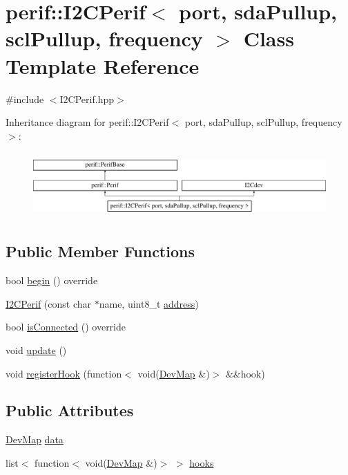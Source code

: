 \hypertarget{classperif_1_1I2CPerif}{}\section{perif\+::I2\+C\+Perif$<$ port, sda\+Pullup, scl\+Pullup, frequency $>$ Class Template Reference}
\label{classperif_1_1I2CPerif}


{\ttfamily \#include $<$I2\+C\+Perif.\+hpp$>$}

Inheritance diagram for perif\+::I2\+C\+Perif$<$ port, sda\+Pullup, scl\+Pullup, frequency $>$\+:\begin{figure}[H]
\begin{center}
\leavevmode
\includegraphics[height=2.514970cm]{classperif_1_1I2CPerif}
\end{center}
\end{figure}
\subsection*{Public Member Functions}
\begin{DoxyCompactItemize}
\item 
bool \mbox{\hyperlink{classperif_1_1I2CPerif_aa91b8eca31223fddd191a50b8a0a526d}{begin}} () override
\item 
\mbox{\hyperlink{classperif_1_1I2CPerif_a80ab5e9bf8a8f2f2278a35d646442b1b}{I2\+C\+Perif}} (const char $\ast$name, uint8\+\_\+t \mbox{\hyperlink{classperif_1_1I2CPerif_a3275bcc89b3d8ddfa221fb76669c2d45}{address}})
\item 
bool \mbox{\hyperlink{classperif_1_1I2CPerif_aa8741297b2f5f9a0242806afa26b7361}{is\+Connected}} () override
\item 
void \mbox{\hyperlink{classperif_1_1Perif_ad6fe1a13354bba4af4cc2751399ed93c}{update}} ()
\item 
void \mbox{\hyperlink{classperif_1_1PerifBase_a2e8bcc221ee253b21b61c7c07307d931}{register\+Hook}} (function$<$ void(\mbox{\hyperlink{Perif_8hpp_a358ff4ee6d24694ee7661f0cce14377e}{Dev\+Map}} \&)$>$ \&\&hook)
\end{DoxyCompactItemize}
\subsection*{Public Attributes}
\begin{DoxyCompactItemize}
\item 
\mbox{\hyperlink{Perif_8hpp_a358ff4ee6d24694ee7661f0cce14377e}{Dev\+Map}} \mbox{\hyperlink{classperif_1_1PerifBase_a1a3afaa535fda17e9f97123fffe78765}{data}}
\item 
list$<$ function$<$ void(\mbox{\hyperlink{Perif_8hpp_a358ff4ee6d24694ee7661f0cce14377e}{Dev\+Map}} \&)$>$ $>$ \mbox{\hyperlink{classperif_1_1PerifBase_a98964e5ca8384df64881265e0aa6d7b6}{hooks}}
\end{DoxyCompactItemize}
